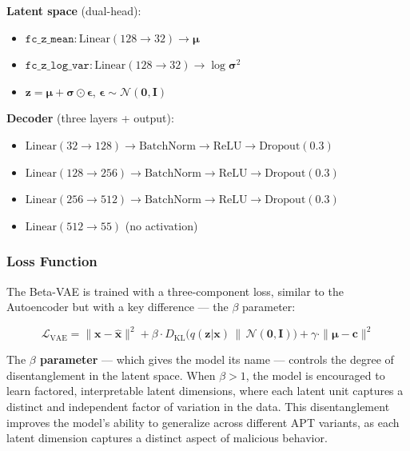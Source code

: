 \textbf{Latent space} (dual-head):
\begin{itemize}
    \item $\texttt{fc\_z\_mean}: \text{Linear}(128 \to 32) \to \boldsymbol{\mu}$
    \item $\texttt{fc\_z\_log\_var}: \text{Linear}(128 \to 32) \to \log \boldsymbol{\sigma}^2$
    \item $\mathbf{z} = \boldsymbol{\mu} + \boldsymbol{\sigma} \odot \boldsymbol{\epsilon}$, \quad $\boldsymbol{\epsilon} \sim \mathcal{N}(\mathbf{0}, \mathbf{I})$
\end{itemize}

\textbf{Decoder} (three layers + output):
\begin{itemize}
    \item $\text{Linear}(32 \to 128) \to \text{BatchNorm} \to \text{ReLU} \to \text{Dropout}(0.3)$
    \item $\text{Linear}(128 \to 256) \to \text{BatchNorm} \to \text{ReLU} \to \text{Dropout}(0.3)$
    \item $\text{Linear}(256 \to 512) \to \text{BatchNorm} \to \text{ReLU} \to \text{Dropout}(0.3)$
    \item $\text{Linear}(512 \to 55)$ \quad (no activation)
\end{itemize}

\subsubsection{Loss Function}

The Beta-VAE is trained with a three-component loss, similar to the Autoencoder but with a key difference --- the $\beta$ parameter:

\begin{equation}
    \mathcal{L}_{\text{VAE}} = \| \mathbf{x} - \hat{\mathbf{x}} \|^2 + \beta \cdot D_{\text{KL}}\big(q(\mathbf{z}|\mathbf{x}) \,\|\, \mathcal{N}(\mathbf{0}, \mathbf{I})\big) + \gamma \cdot \| \boldsymbol{\mu} - \mathbf{c} \|^2
    \label{eq:vae_loss}
\end{equation}

The \textbf{$\beta$ parameter} --- which gives the model its name --- controls the degree of disentanglement in the latent space. When $\beta > 1$, the model is encouraged to learn factored, interpretable latent dimensions, where each latent unit captures a distinct and independent factor of variation in the data. This disentanglement improves the model's ability to generalize across different APT variants, as each latent dimension captures a distinct aspect of malicious behavior.


